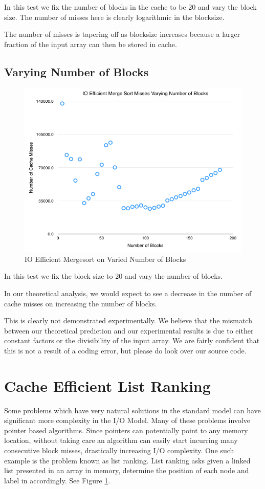 \documentclass[11pt]{article}
\begin{document}
In this test we fix the number of blocks in the cache to be 20 and vary the block size. The number of misses here is clearly logarithmic in the blocksize. 

The number of misses is tapering off as blocksize increases because a larger fraction of the input array can then be stored in cache.

\subsection{Varying Number of Blocks}

\begin{figure}[H]  
\includegraphics[scale=0.45]{figures/NumBlocks_IOEfficientMergeSort.png}
\caption{IO Efficient Mergesort on Varied Number of Blocks}
\label{listrankingio}
\end{figure}

In this test we fix the block size to 20 and vary the number of blocks.

In our theoretical analysis, we would expect to see a decrease in the number of cache misses on increasing the number of blocks. 

This is clearly not demonstrated experimentally. We believe that the mismatch between our theoretical prediction and our experimental results is due to either constant factors or the divisibility of the input array. We are fairly confident that this is not a result of a coding error, but please do look over our source code.


\section{Cache Efficient List Ranking}
Some problems which have very natural solutions in the standard model can have significant more complexity in the I/O Model. 
Many of these problems involve pointer based algorithms.  Since pointers can potentially point to any memory location, without 
taking care an algorithm can easily start incurring many consecutive block misses, drastically increasing I/O complexity.  One 
such example is the problem known as list ranking.  List ranking asks given a linked list presented in an array in memory, determine 
the position of each node and label in accordingly.  See Figure  \ref{listrankingio}.
\end{document}
